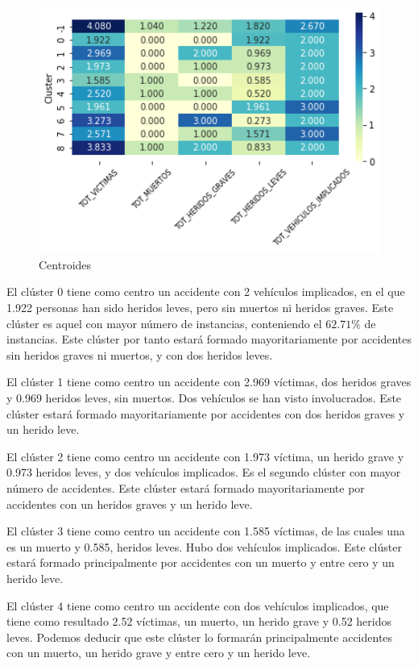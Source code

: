 \documentclass[a4]{article}
\begin{document}
\begin{figure}[H]
  \centering
  \caption{Centroides}
  \includegraphics[width=130mm]{imagenes/c1_dbscan_centroides}
\end{figure}

El clúster 0 tiene como centro un accidente con 2 vehículos implicados, en el que 1.922 personas han sido heridos leves, pero sin muertos ni heridos graves. Este clúster es aquel con mayor número de instancias, conteniendo el $62.71\%$ de instancias. Este clúster por tanto estará formado mayoritariamente por accidentes sin heridos graves ni muertos, y con dos heridos leves.

El clúster 1 tiene como centro un accidente con 2.969 víctimas, dos heridos graves y 0.969 heridos leves, sin muertos. Dos vehículos se han visto involucrados. Este clúster estará formado mayoritariamente por accidentes con dos heridos graves y un herido leve.

El clúster 2 tiene como centro un accidente con 1.973 víctima, un herido grave y 0.973 heridos leves, y dos vehículos implicados. Es el segundo clúster con mayor número de accidentes. Este clúster estará formado mayoritariamente por accidentes con un heridos graves y un herido leve.

El clúster 3 tiene como centro un accidente con 1.585 víctimas, de las cuales una es un muerto y 0.585, heridos leves. Hubo dos vehículos implicados. Este clúster estará formado principalmente por accidentes con un muerto y entre cero y un herido leve.

El clúster 4 tiene como centro un accidente con dos vehículos implicados, que tiene como resultado 2.52 víctimas, un muerto, un herido grave y 0.52 heridos leves. Podemos deducir que este clúster lo formarán principalmente accidentes con un muerto, un herido grave y entre cero y un herido leve.
\end{document}
